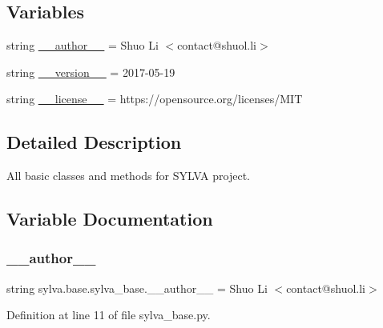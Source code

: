\subsection*{Variables}
\begin{DoxyCompactItemize}
\item 
string \hyperlink{namespacesylva_1_1base_1_1sylva__base_a9fea8ee3b352af33fbc91fc6b30bc96d}{\+\_\+\+\_\+author\+\_\+\+\_\+} = \textquotesingle{}Shuo Li $<$contact@shuol.\+li$>$\textquotesingle{}
\item 
string \hyperlink{namespacesylva_1_1base_1_1sylva__base_a1c9ea5e48ee3c68a0be5f377d7ccbc7b}{\+\_\+\+\_\+version\+\_\+\+\_\+} = \textquotesingle{}2017-\/05-\/19\textquotesingle{}
\item 
string \hyperlink{namespacesylva_1_1base_1_1sylva__base_aae4c25229ad03df0705787971e295dd3}{\+\_\+\+\_\+license\+\_\+\+\_\+} = \textquotesingle{}https\+://opensource.\+org/licenses/M\+IT\textquotesingle{}
\end{DoxyCompactItemize}


\subsection{Detailed Description}
All basic classes and methods for S\+Y\+L\+VA project. 

\subsection{Variable Documentation}
\mbox{\label{namespacesylva_1_1base_1_1sylva__base_a9fea8ee3b352af33fbc91fc6b30bc96d}} 
\subsubsection{\texorpdfstring{\+\_\+\+\_\+author\+\_\+\+\_\+}{\_\_author\_\_}}
{\footnotesize\ttfamily string sylva.\+base.\+sylva\+\_\+base.\+\_\+\+\_\+author\+\_\+\+\_\+ = \textquotesingle{}Shuo Li $<$contact@shuol.\+li$>$\textquotesingle{}\hspace{0.3cm}{\ttfamily [private]}}



Definition at line 11 of file sylva\+\_\+base.\+py.

